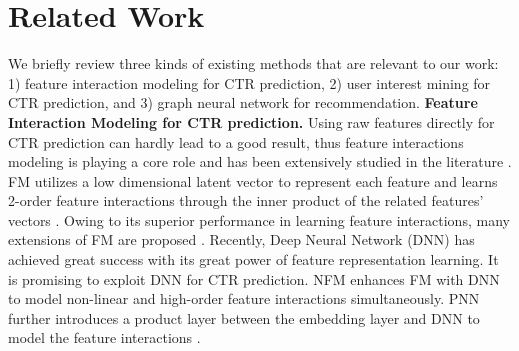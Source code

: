 


\section{Related Work}\label{related_work}
We briefly review three kinds of existing methods that are relevant to our work: 1) feature interaction modeling for CTR prediction, 2) user interest mining for CTR prediction, and 3) graph neural network for recommendation.
\newline
\textbf{Feature Interaction Modeling for CTR prediction.}
Using raw features directly for CTR prediction can hardly lead to a good result, thus feature interactions modeling is playing a core role and has been extensively studied in the literature \cite{lian2018xdeepfm}.
FM utilizes a low dimensional latent vector to represent each feature and learns 2-order feature interactions through the inner product of the related features' vectors \cite{rendle2010factorization}.
Owing to its superior performance in learning feature interactions, many extensions of FM are proposed \cite{juan2016field,pan2018field, xiao2017attentional}.
Recently, Deep Neural Network (DNN) has achieved great success with its great power of feature representation learning.
It is promising to exploit DNN for CTR prediction.
NFM \cite{he2017neural} enhances FM with DNN to model non-linear and high-order feature interactions simultaneously.
PNN further introduces a product layer between the embedding layer and DNN to model the feature interactions \cite{qu2018product}.

